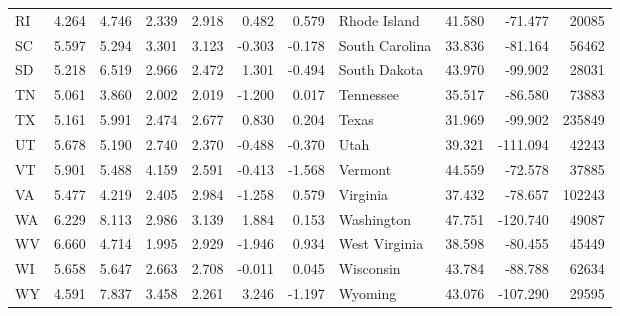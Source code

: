 \begin{tabular}{lrrrrrrlrrr}
RI & 4.264 & 4.746 & 2.339 & 2.918 & 0.482 & 0.579 & Rhode Island & 41.580 & -71.477 & 20085 \\
SC & 5.597 & 5.294 & 3.301 & 3.123 & -0.303 & -0.178 & South Carolina & 33.836 & -81.164 & 56462 \\
SD & 5.218 & 6.519 & 2.966 & 2.472 & 1.301 & -0.494 & South Dakota & 43.970 & -99.902 & 28031 \\
TN & 5.061 & 3.860 & 2.002 & 2.019 & -1.200 & 0.017 & Tennessee & 35.517 & -86.580 & 73883 \\
TX & 5.161 & 5.991 & 2.474 & 2.677 & 0.830 & 0.204 & Texas & 31.969 & -99.902 & 235849 \\
UT & 5.678 & 5.190 & 2.740 & 2.370 & -0.488 & -0.370 & Utah & 39.321 & -111.094 & 42243 \\
VT & 5.901 & 5.488 & 4.159 & 2.591 & -0.413 & -1.568 & Vermont & 44.559 & -72.578 & 37885 \\
VA & 5.477 & 4.219 & 2.405 & 2.984 & -1.258 & 0.579 & Virginia & 37.432 & -78.657 & 102243 \\
WA & 6.229 & 8.113 & 2.986 & 3.139 & 1.884 & 0.153 & Washington & 47.751 & -120.740 & 49087 \\
WV & 6.660 & 4.714 & 1.995 & 2.929 & -1.946 & 0.934 & West Virginia & 38.598 & -80.455 & 45449 \\
WI & 5.658 & 5.647 & 2.663 & 2.708 & -0.011 & 0.045 & Wisconsin & 43.784 & -88.788 & 62634 \\
WY & 4.591 & 7.837 & 3.458 & 2.261 & 3.246 & -1.197 & Wyoming & 43.076 & -107.290 & 29595 \\
\bottomrule
\end{tabular}
